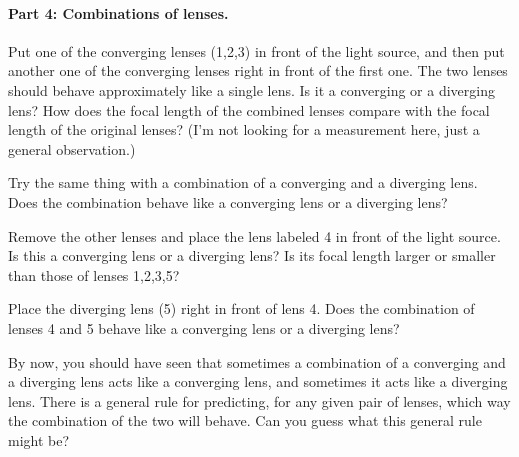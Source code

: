 \answerspace{1.0in}

\paragraph{Part 4: Combinations of lenses.}
Put one of the converging lenses (1,2,3) in front of the light source, and
then put another one of the converging lenses right in front of the first
one.  The two lenses should behave approximately like a single lens.
Is it a converging or a diverging lens?  How does the focal length of
the combined lenses compare with the focal length of the original
lenses?  (I'm not looking for a measurement here, just a general
observation.)

\answerspace{1.4in}

Try the same thing with a combination of a converging and a diverging
lens.  Does the combination behave like a converging lens or a diverging
lens?  

\answerspace{1.4in}

Remove the other lenses and place the lens labeled 4 in front
of the light source.  Is this a converging lens or a diverging lens?
Is its focal length larger or smaller than those of lenses 1,2,3,5?

\answerspace{1.4in}

Place the diverging lens (5) right in front of lens 4.  Does the combination
of lenses 4 and 5 behave like a converging lens or a diverging lens?

\answerspace{1.4in}

By now, you should have seen that sometimes a combination of a converging
and a diverging lens acts like a converging lens, and sometimes it
acts like a diverging lens.  There is a general rule for predicting,
for any given pair of lenses, which way the combination of the two
will behave.  Can you guess what this general rule might be?

\answerspace{0.7in}

